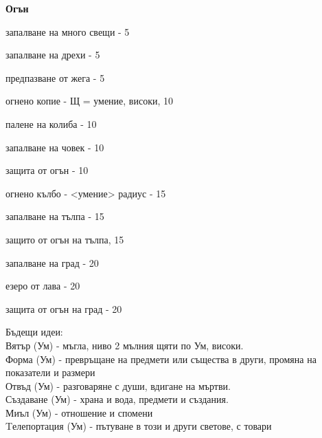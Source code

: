 \vspace{1cm}
\textbf{Огън}
\begin{itemize*}
  \item{запалване на много свещи - 5}
  \item{запалване на дрехи - 5}
  \item{предпазване от жега - 5}
  \item{огнено копие - Щ = умение, високи, 10}
  \item{палене на колиба - 10}
  \item{запалване на човек - 10}
  \item{защита от огън - 10}
  \item{огнено кълбо - <умение> радиус - 15}
  \item{запалване на тълпа - 15}
  \item{защито от огън на тълпа, 15}
  \item{запалване на град - 20}
  \item{езеро от лава - 20}
  \item{защита от огън на град - 20}
\end{itemize*}

Бъдещи идеи:  \\
Вятър (Ум)        - мъгла, ниво 2 мълния щяти по Ум, високи.                                         \\
Форма (Ум)        - превръщане на предмети или същества в други, промяна на показатели и размери     \\
Отвъд (Ум)        - разговаряне с души, вдигане на мъртви.                                           \\
Създаване (Ум)    - храна и вода, предмети и създания.                                               \\
Миъл (Ум)         - отношение и спомени                                                              \\
Tелепортация (Ум) - пътуване в този и други светове, с товари                                        \\






